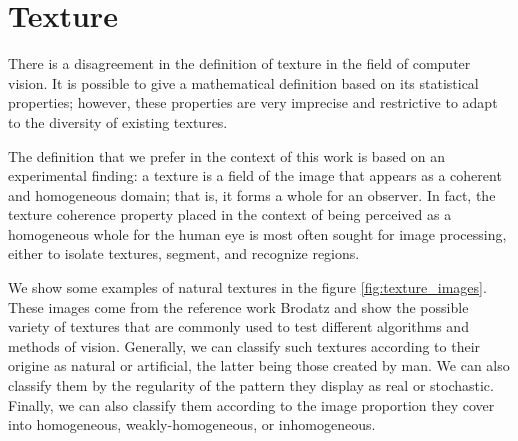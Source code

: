 \section{Texture}
There is a disagreement in the definition of texture in the field of computer vision. It is possible to give a mathematical definition based on its statistical properties; however, these properties are very imprecise and restrictive to adapt to the diversity of existing textures.

The definition that we prefer in the context of this work is based on an experimental finding: a texture is a field of the image that appears as a coherent and homogeneous domain; that is, it forms a whole for an observer. In fact, the texture coherence property placed in the context of being perceived as a homogeneous whole for the human eye is most often sought for image processing, either to isolate textures, segment, and recognize regions.

We show some examples of natural textures in the figure \ref{fig:texture_images}. These images come from the reference work Brodatz and show the possible variety of textures that are commonly used to test different algorithms and methods of vision. Generally, we can classify such textures according to their origine as natural or artificial, the latter being those created by man. We can also classify them by the regularity of the pattern they display as real or stochastic. Finally, we can also classify them according to the image proportion they cover into homogeneous, weakly-homogeneous, or inhomogeneous.


